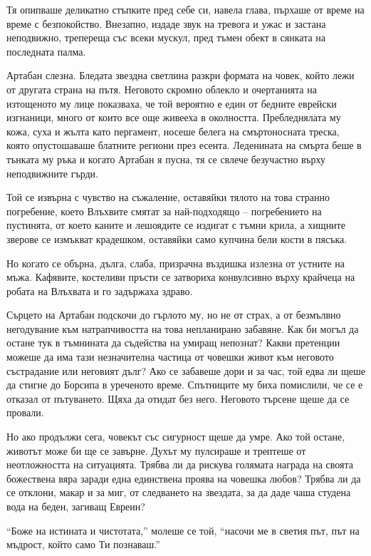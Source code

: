 \documentclass[oneside,10pt]{memoir}
\begin{document}
Тя опипваше деликатно стъпките пред себе си, навела глава, пърхаше от време на
време с безпокойство. Внезапно, издаде звук на тревога и ужас и застана
неподвижно, трепереща със всеки мускул, пред тъмен обект в сянката на последната
палма.

Артабан слезна. Бледата звездна светлина разкри формата на човек, който лежи от
другата страна на пътя. Неговото скромно облекло и очертанията на изтощеното му
лице показваха, че той вероятно е един от бедните еврейски изгнаници, много от
които все още живееха в околността. Пребледнялата му кожа, суха и жълта като
пергамент, носеше белега на смъртоносната треска, която опустошаваше блатните
региони през есента. Леденината на смърта беше в тънката му ръка и когато
Артабан я пусна, тя се свлече безучастно върху неподвижните гърди.

Той се извърна с чувство на съжаление, оставяйки тялото на това странно
погребение, което Влъхвите смятат за най-подходящо -- погребението на пустинята,
от което каните и лешоядите се издигат с тъмни крила, а хищните зверове се
измъкват крадешком, оставяйки само купчина бели кости в пясъка.

Но когато се обърна, дълга, слаба, призрачна въздишка излезна от устните на мъжа.
Кафявите, костеливи пръсти се затвориха конвулсивно върху крайчеца на робата на
Влъхвата и го задържаха здраво.

Сърцето на Артабан подскочи до гърлото му, но не от страх, а от безмълвно
негодувание към натрапчивостта на това непланирано забавяне. Как би могъл да
остане тук в тъмнината да съдейства на умиращ непознат? Какви претенции можеше
да има тази незначителна частица от човешки живот към неговото състрадание или
неговият дълг? Ако се забавеше дори и за час, той едва ли щеше да стигне до
Борсипа в уреченото време. Спътниците му биха помислили, че се е отказал от
пътуването. Щяха да отидат без него. Неговото търсене щеше да се провали.

Но ако продължи сега, човекът със сигурност щеше да умре. Ако той остане,
животът може би ще се завърне. Духът му пулсираше и трептеше от неотложността на
ситуацията. Трябва ли да рискува голямата награда на своята божествена вяра
заради една единствена проява на човешка любов? Трябва ли да се отклони, макар и
за миг, от следването на звездата, за да даде чаша студена вода на беден,
загиващ Евреин?

``Боже на истината и чистотата,'' молеше се той, ``насочи ме в светия път, път
на мъдрост, който само Ти познаваш.''
\end{document}
